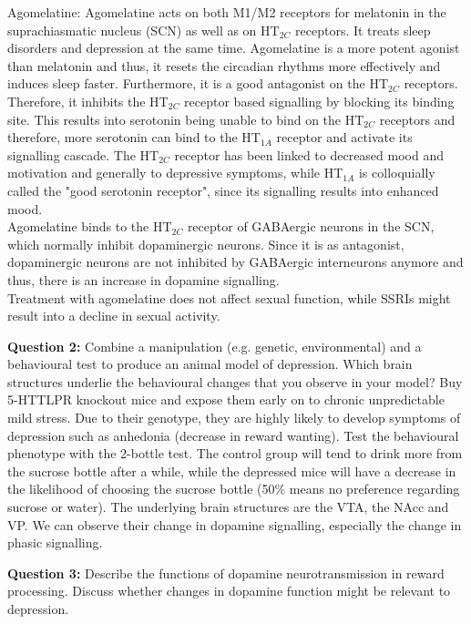 \documentclass[twosided, a4paper, pt11]{article}
\begin{document}
	Agomelatine: Agomelatine acts on both M1/M2 receptors for melatonin in the suprachiasmatic nucleus (SCN) as well as on HT$_{2C}$ receptors. It treats sleep disorders and depression at the same time. Agomelatine is a more potent agonist than melatonin and thus, it resets the circadian rhythms more effectively and induces sleep faster. Furthermore, it is a good antagonist on the HT$_{2C}$ receptors. Therefore, it inhibits the HT$_{2C}$ receptor based signalling by blocking its binding site. This results into serotonin being unable to bind on the HT$_{2C}$ receptors and therefore, more serotonin can bind to the HT$_{1A}$ receptor and activate its signalling cascade. The HT$_{2C}$ receptor has been linked to decreased mood and motivation and generally to depressive symptoms, while HT$_{1A}$ is colloquially called the "good serotonin receptor", since its signalling results into enhanced mood.\\
	Agomelatine binds to the HT$_{2C}$ receptor of GABAergic neurons in the SCN, which normally inhibit dopaminergic neurons. Since it is as antagonist, dopaminergic neurons are not inhibited by GABAergic interneurons anymore and thus, there is an increase in dopamine signalling.\\
	Treatment with agomelatine does not affect sexual function, while SSRIs might result into a decline in sexual activity.\newline
	
	\textbf{Question 2:} Combine a manipulation (e.g. genetic, environmental) and a behavioural test to produce an animal model of depression. Which brain structures underlie the behavioural changes that you observe in your model?\newline
	Buy 5-HTTLPR knockout mice and expose them early on to chronic unpredictable mild stress. Due to their genotype, they are highly likely to develop symptoms of depression such as anhedonia (decrease in reward wanting). Test the behavioural phenotype with the 2-bottle test. The control group will tend to drink more from the sucrose bottle after a while, while the depressed mice will have a decrease in the likelihood of choosing the sucrose bottle (50$\%$ means no preference regarding sucrose or water). The underlying brain structures are the VTA, the NAcc and VP. We can observe their change in dopamine signalling, especially the change in phasic signalling.\newline
	
	
	\textbf{Question 3:} Describe the functions of dopamine neurotransmission in reward processing. Discuss whether changes in dopamine function might be relevant to depression.\newline
	
\end{document}
